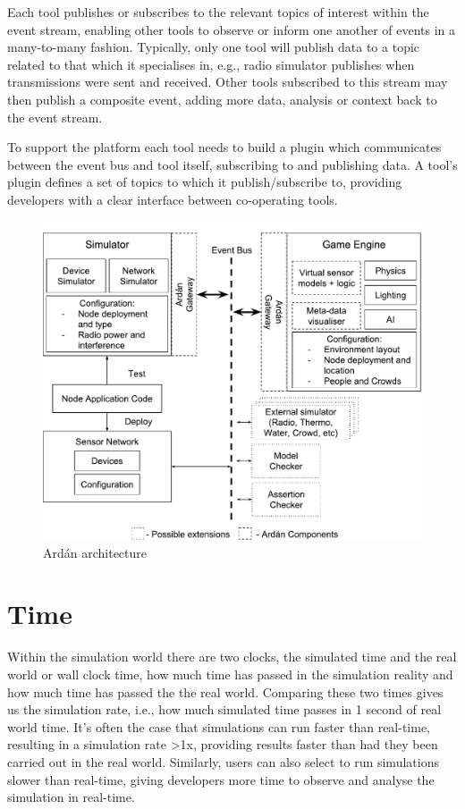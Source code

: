 Each tool publishes or subscribes to the relevant topics of interest within the event stream, enabling other tools to observe or inform one another of events in a many-to-many fashion. Typically, only one tool will publish data to a topic related to that which it specialises in, e.g., radio simulator publishes when transmissions were sent and received. Other tools subscribed to this stream may then publish a composite event, adding more data, analysis or context back to the event stream.

To support the platform each tool needs to build a plugin which communicates between the event bus and tool itself, subscribing to and publishing data. A tool's plugin defines a set of topics to which it publish/subscribe to, providing developers with a clear interface between co-operating tools.
\begin{figure}[ht]
\centering
  \includegraphics[width=\textwidth]{./imgs/architecture}
  \caption{Ard\'{a}n architecture}
  \label{fig:architecture}
\end{figure}



\section{Time} %
\label{sub:time}
Within the simulation world there are two clocks, the simulated time and the real world or wall clock time, how much time has passed in the simulation reality and how much time has passed the the real world. Comparing these two times gives us the simulation rate, i.e., how much simulated time passes in 1 second of real world time. It's often the case that simulations can run faster than real-time, resulting in a simulation rate >1x, providing results faster than had they been carried out in the real world. Similarly, users can also select to run simulations slower than real-time, giving developers more time to observe and analyse the simulation in real-time.

